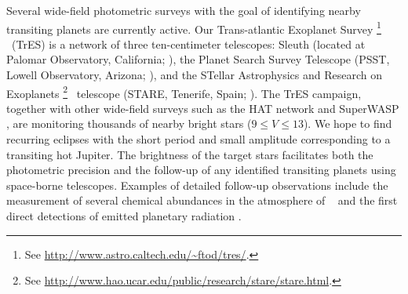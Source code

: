 Several wide-field photometric surveys with the goal of identifying
nearby transiting planets are currently active. Our
Trans-atlantic Exoplanet Survey%
\footnote{See \url{http://www.astro.caltech.edu/\~ftod/tres/}.}%
\ (TrES) is a network of three ten-centimeter telescopes:
Sleuth (located at Palomar Observatory, California; \citealt{ODonovan_Charbonneau_Kotredes:AIP:2004a}), the Planet Search Survey Telescope (PSST, Lowell Observatory, Arizona; \citealt{Dunham_Mandushev_Taylor:pasp:2004a}),
and the STellar Astrophysics and Research on Exoplanets%
\footnote{See \url{http://www.hao.ucar.edu/public/research/stare/stare.html}.}%
\ telescope (STARE, Tenerife, Spain; \citealt{Alonso_Deeg_Brown:an:2004a}). The TrES
campaign, together with other wide-field surveys such as the HAT
network \citep{Bakos_Lazar_Papp:pasp:2002a} and SuperWASP
\citep{Street_Pollaco_Fitzsimmons:ASP:2003a}, are monitoring thousands
of nearby bright stars ($9\leq V \leq 13$). We hope to find recurring
eclipses with the short period and small amplitude corresponding to a
transiting hot Jupiter. The brightness of the target stars facilitates
both the photometric precision and the follow-up of any identified
transiting planets using space-borne telescopes. Examples of detailed
follow-up observations include the measurement of several chemical
abundances in the atmosphere of \hdTZNb\
\citep{Charbonneau_Brown_Noyes:apj:2002a, Vidal-Madjar_Lecavelier-des-Etangs_Desert:nat:2003a}
and the first direct detections of emitted planetary radiation
\citep{Charbonneau_Allen_Megeath:apj:2005a, Deming_Seager_Richardson:nat:2005a}.

